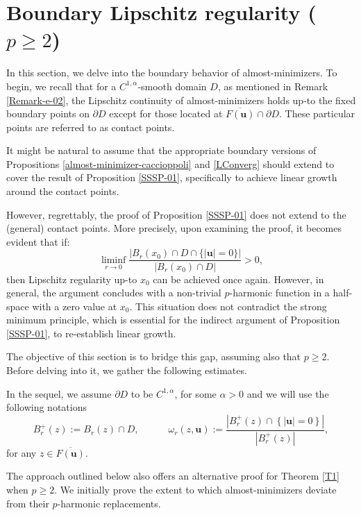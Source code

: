 \documentclass{amsart}
\begin{document}
\medskip


\section{Boundary Lipschitz regularity ($p\geq 2$)}
\label{LLL-section}



 In this section, we delve into the boundary behavior of almost-minimizers. To begin, we recall that for a $C^{1,\alpha}$-smooth domain $D$, as mentioned in Remark \ref{Remark-e-02}, the Lipschitz continuity of almost-minimizers holds up-to the fixed boundary points on $\partial D$ except for those located at $\overline{F(\mathbf{u})} \cap \partial D$. These particular points are referred to as contact points.

 

It might be natural to assume that the appropriate boundary versions of Propositions \ref{almost-minimizer-caccioppoli} and \ref{LConverg} should extend to cover the result of Proposition \ref{SSSP-01}, specifically to achieve linear growth around the contact points.

However, regrettably, the proof of Proposition \ref{SSSP-01} does not extend to the (general) contact points. More precisely, upon examining the proof, it becomes evident that if:
$$ \liminf_{r \to 0} \frac{\left|B_r(x_0) \cap D \cap \{|\mathbf{u}|=0\}  \right|}{|B_r(x_0) \cap D|} > 0,$$
then Lipschitz regularity up-to $x_0$ can be achieved once again. However, in general, the argument concludes with a non-trivial $p$-harmonic function in a half-space with a zero value at $x_0$. This situation does not contradict the strong minimum principle, which is essential for the indirect argument of Proposition \ref{SSSP-01}, to re-establish linear growth.

The objective of this section is to bridge this gap, assuming also that $p \geq 2$. Before delving into it, we gather the following estimates.

In the sequel, we   assume $\partial D$ to be $C^{1,\alpha}$, for some $\alpha >0$ and we will  use the following notations
$$ B_r^+ (z) :=B_r(z) \cap D, 
\qquad \quad  \omega_r(z,\mathbf{u}):=\frac{\left| B^+_r (z) \cap \left\{ |\mathbf{u}|=0 \right\}   \right|}{\left| B_r^+(z) \right|}, $$ 
for any $z \in \overline{F(\mathbf{u})}$.
 



The approach outlined below also offers an alternative proof for Theorem \ref{T1} when $p \ge 2$. 
We initially prove  the extent to which almost-minimizers deviate from their $p$-harmonic replacements. 
\end{document}
